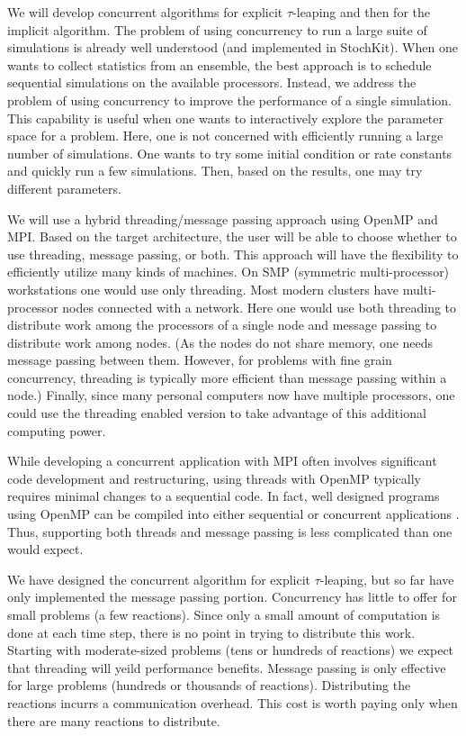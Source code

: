 \documentclass{article}
\begin{document}
We will develop concurrent algorithms for explicit $\tau$-leaping and then
for the implicit algorithm.  The problem of using concurrency to run a 
large suite of simulations is already well understood (and implemented 
in StochKit).  When one wants to collect
statistics from an ensemble, the best approach is to schedule sequential
simulations on the available processors.  Instead, we address the problem
of using concurrency to improve the performance of a single simulation.
This capability is useful when one wants to interactively explore the parameter
space for a problem.  Here, one is not concerned with efficiently running
a large number of simulations.  One wants to try some initial condition or rate 
constants and quickly run a few simulations.  Then, based on the results,
one may try different parameters.  


We will use a hybrid threading/message passing approach using OpenMP
and MPI.  Based on the target architecture, the user will be able to
choose whether to use threading, message passing, or both.  This
approach will have the flexibility to efficiently utilize many kinds
of machines.  On SMP (symmetric multi-processor) workstations one
would use only threading.  Most modern clusters have multi-processor
nodes connected with a network.  Here one would use both threading to
distribute work among the processors of a single node and message
passing to distribute work among nodes.  (As the nodes do not share
memory, one needs message passing between them.  However, for
problems with fine grain concurrency, threading is typically
more efficient than message passing within a node.)  Finally, since
many personal computers now have multiple processors, one could use
the threading enabled version to take advantage of this additional
computing power.


While developing a concurrent application with MPI often involves 
significant code development and restructuring, using threads
with OpenMP typically requires minimal changes to a sequential code.
In fact, well designed programs using OpenMP can be compiled into 
either sequential or concurrent applications \cite{chandra}.  Thus, 
supporting both threads and message passing is less complicated than
one would expect.


We have designed the concurrent algorithm for explicit $\tau$-leaping,
but so far have only implemented the message passing portion.
Concurrency has little to offer for small problems (a few reactions).  
Since only a small amount of computation is done at each time
step, there is no point in trying to distribute this work.  Starting
with moderate-sized problems (tens or hundreds of reactions) we expect
that threading will yeild performance benefits.  Message passing is only 
effective for large problems (hundreds or thousands of reactions).
Distributing the reactions incurrs a communication overhead.  This cost
is worth paying only when there are many reactions to distribute.
\end{document}
